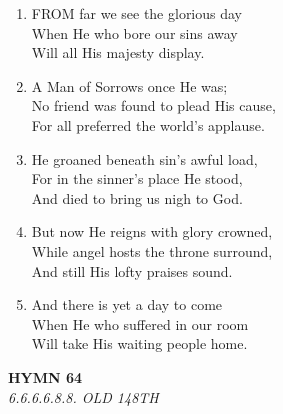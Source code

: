 \begin{enumerate}
    \item FROM far we see the glorious day \\
        When He who bore our sins away \\
        Will all His majesty display.

    \item A Man of Sorrows once He was; \\
        No friend was found to plead His cause, \\
        For all preferred the world's applause.

    \item He groaned beneath sin's awful load, \\
        For in the sinner's place He stood, \\
        And died to bring us nigh to God.

    \item But now He reigns with glory crowned, \\
        While angel hosts the throne surround, \\
        And still His lofty praises sound.

    \item And there is yet a day to come \\
        When He who suffered in our room \\
        Will take His waiting people home.

\end{enumerate}

\newpage
\begin{center}
    {\Large \textbf{HYMN 64}}
    \\
    \textit{6.6.6.6.8.8. OLD 148TH}
\end{center}
\vspace{1em}

